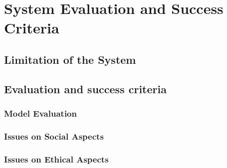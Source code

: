 \section{System Evaluation and Success Criteria}

\subsection{Limitation of the System}
\subsection{Evaluation and success criteria}
  \subsubsection{Model Evaluation}
  \subsubsection{Issues on Social Aspects}
  \subsubsection{Issues on Ethical Aspects}